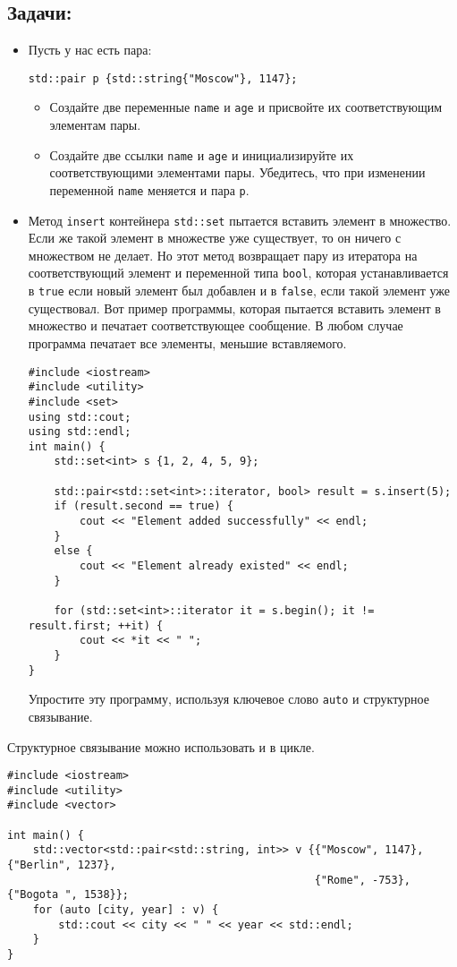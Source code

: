 \documentclass{article}
\begin{document}
\subsection*{Задачи:}
\begin{itemize}
\item Пусть у нас есть пара:
\begin{lstlisting}
std::pair p {std::string{"Moscow"}, 1147};
\end{lstlisting}
\begin{itemize}
\item Создайте две переменные \texttt{name} и \texttt{age} и присвойте их соответствующим элементам пары.
\item Создайте две ссылки \texttt{name} и \texttt{age} и инициализируйте их соответствующими элементами пары. Убедитесь, что при изменении переменной \texttt{name} меняется и пара \texttt{p}.
\end{itemize}

\item Метод \texttt{insert} контейнера \texttt{std::set}  пытается вставить элемент в множество. Если же такой элемент в множестве уже существует, то он ничего с множеством не делает. Но этот метод возвращает пару из итератора на соответствующий элемент и переменной типа \texttt{bool}, которая устанавливается в \texttt{true} если новый элемент был добавлен и в \texttt{false}, если такой элемент уже существовал. Вот пример программы, которая пытается вставить элемент в множество и печатает соответствующее сообщение. В любом случае программа печатает все элементы, меньшие вставляемого.

\begin{lstlisting}
#include <iostream>
#include <utility>
#include <set>
using std::cout;
using std::endl;
int main() {
    std::set<int> s {1, 2, 4, 5, 9};
    
    std::pair<std::set<int>::iterator, bool> result = s.insert(5);
    if (result.second == true) {
        cout << "Element added successfully" << endl;
    }
    else {
        cout << "Element already existed" << endl;
    }
    
    for (std::set<int>::iterator it = s.begin(); it != result.first; ++it) {
        cout << *it << " ";
    }
}
\end{lstlisting}
Упростите эту программу, используя ключевое слово \texttt{auto} и структурное связывание.
\end{itemize}
\newpage
Структурное связывание можно использовать и в цикле.
\begin{lstlisting}
#include <iostream>
#include <utility>
#include <vector>

int main() {
    std::vector<std::pair<std::string, int>> v {{"Moscow", 1147}, {"Berlin", 1237}, 
                                                {"Rome", -753},  {"Bogota ", 1538}};
    for (auto [city, year] : v) {
        std::cout << city << " " << year << std::endl;
    }
}
\end{lstlisting}
\end{document}
